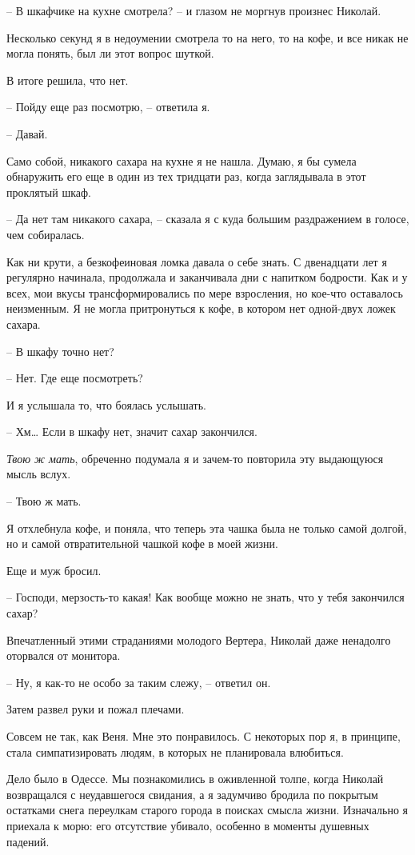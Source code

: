 \documentclass[
]{book}
\begin{document}
-- В шкафчике на кухне смотрела? -- и глазом не моргнув произнес Николай.

Несколько секунд я в недоумении смотрела то на него, то на кофе, и все никак не могла понять, был ли этот вопрос шуткой.

В итоге решила, что нет.

-- Пойду еще раз посмотрю, -- ответила я.

-- Давай.

Само собой, никакого сахара на кухне я не нашла. Думаю, я бы сумела обнаружить его еще в один из тех тридцати раз, когда заглядывала в этот проклятый шкаф.

-- Да нет там никакого сахара, -- сказала я с куда большим раздражением в голосе, чем собиралась.

Как ни крути, а безкофеиновая ломка давала о себе знать. С двенадцати лет я регулярно начинала, продолжала и заканчивала дни с напитком бодрости. Как и у всех, мои вкусы трансформировались по мере взросления, но кое-что оставалось неизменным. Я не могла притронуться к кофе, в котором нет одной-двух ложек сахара.

-- В шкафу точно нет?

-- Нет. Где еще посмотреть?

И я услышала то, что боялась услышать.

-- Хм\ldots{} Если в шкафу нет, значит сахар закончился.

\emph{Твою ж мать}, обреченно подумала я и зачем-то повторила эту выдающуюся мысль вслух.

-- Твою ж мать.

Я отхлебнула кофе, и поняла, что теперь эта чашка была не только самой долгой, но и самой отвратительной чашкой кофе в моей жизни.

Еще и муж бросил.

-- Господи, мерзость-то какая! Как вообще можно не знать, что у тебя закончился сахар?

Впечатленный этими страданиями молодого Вертера, Николай даже ненадолго оторвался от монитора.

-- Ну, я как-то не особо за таким слежу, -- ответил он.

Затем развел руки и пожал плечами.

Совсем не так, как Веня. Мне это понравилось. С некоторых пор я, в принципе, стала симпатизировать людям, в которых не планировала влюбиться.

Дело было в Одессе. Мы познакомились в оживленной толпе, когда Николай возвращался с неудавшегося свидания, а я задумчиво бродила по покрытым остатками снега переулкам старого города в поисках смысла жизни. Изначально я приехала к морю: его отсутствие убивало, особенно в моменты душевных падений.
\end{document}
